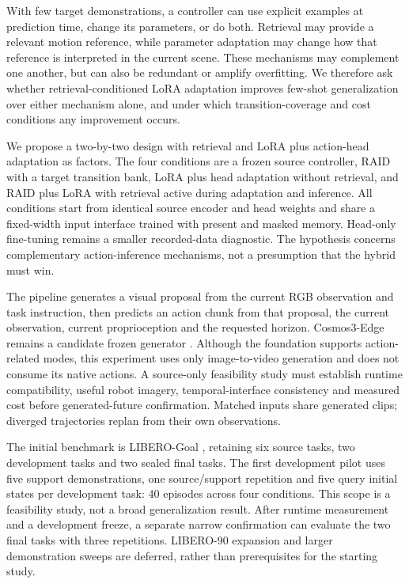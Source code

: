 \documentclass[11pt,a4paper]{article}
\begin{document}
With few target demonstrations, a controller can use explicit examples at prediction time, change its parameters, or do both. Retrieval may provide a relevant motion reference, while parameter adaptation may change how that reference is interpreted in the current scene. These mechanisms may complement one another, but can also be redundant or amplify overfitting. We therefore ask whether retrieval-conditioned LoRA adaptation improves few-shot generalization over either mechanism alone, and under which transition-coverage and cost conditions any improvement occurs.

We propose a two-by-two design with retrieval and LoRA plus action-head adaptation as factors. The four conditions are a frozen source controller, RAID with a target transition bank, LoRA plus head adaptation without retrieval, and RAID plus LoRA with retrieval active during adaptation and inference. All conditions start from identical source encoder and head weights and share a fixed-width input interface trained with present and masked memory. Head-only fine-tuning remains a smaller recorded-data diagnostic. The hypothesis concerns complementary action-inference mechanisms, not a presumption that the hybrid must win.

The pipeline generates a visual proposal from the current RGB observation and task instruction, then predicts an action chunk from that proposal, the current observation, current proprioception and the requested horizon. Cosmos3-Edge remains a candidate frozen generator \cite{ref7,ref32}. Although the foundation supports action-related modes, this experiment uses only image-to-video generation and does not consume its native actions. A source-only feasibility study must establish runtime compatibility, useful robot imagery, temporal-interface consistency and measured cost before generated-future confirmation. Matched inputs share generated clips; diverged trajectories replan from their own observations.

The initial benchmark is LIBERO-Goal \cite{ref8}, retaining six source tasks, two development tasks and two sealed final tasks. The first development pilot uses five support demonstrations, one source/support repetition and five query initial states per development task: 40 episodes across four conditions. This scope is a feasibility study, not a broad generalization result. After runtime measurement and a development freeze, a separate narrow confirmation can evaluate the two final tasks with three repetitions. LIBERO-90 expansion and larger demonstration sweeps are deferred, rather than prerequisites for the starting study.
\end{document}
